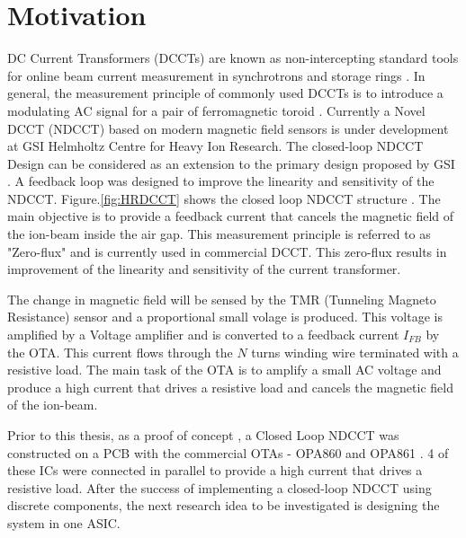 \vfill
\clearpage

\section{Motivation}

DC Current Transformers (DCCTs) are known as  non-intercepting  standard  tools  for online beam current measurement in synchrotrons and storage rings \cite{sensor_ndcct_gsi}. In general, the measurement principle of commonly used DCCTs is to introduce a modulating AC signal for a pair of ferromagnetic toroid \cite{ndcct_gsi}. Currently a Novel DCCT (NDCCT) based on modern magnetic field sensors is under development at GSI Helmholtz Centre for Heavy Ion Research. The closed-loop NDCCT Design can be considered as an extension to the primary design proposed by GSI \cite{ndcct_gsi}. A feedback loop was designed to improve the linearity and sensitivity of the NDCCT. Figure.\ref{fig:HRDCCT} shows the closed loop NDCCT structure \cite{hrdcct}. The main objective is to provide a feedback current that cancels the magnetic field of the ion-beam inside the air gap. This measurement principle is referred to as "Zero-flux" and is currently used in commercial DCCT. This zero-flux results in improvement of the linearity and sensitivity of the current transformer.

The change in magnetic field will be sensed by the TMR (Tunneling Magneto Resistance) sensor and a proportional small volage is produced. This voltage is amplified by a Voltage amplifier and is converted to a feedback current $I_{FB}$ by the OTA. This current flows through the $N$ turns winding wire terminated with a resistive load. The main task of the OTA is to amplify a small AC voltage and produce a high current that drives a resistive load and cancels the magnetic field of the ion-beam.

Prior to this thesis, as a proof of concept \cite{hrdcct}, a Closed Loop NDCCT was constructed on a PCB with the commercial OTAs - OPA860 and OPA861 \cite{opa861}. 4 of these ICs were connected in parallel to provide a high current that drives a resistive load. After the success of implementing a closed-loop NDCCT using discrete components, the next research idea to be investigated is designing the system in one ASIC.

